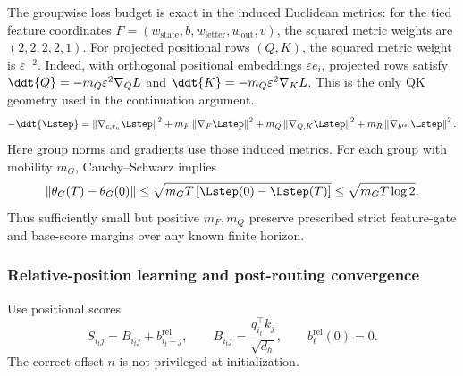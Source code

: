 The groupwise loss budget is exact in the induced Euclidean metrics:
for the tied feature coordinates $F=(w_{\mathrm{state}},b,w_{\mathrm{letter}},w_{\mathrm{out}},v)$, the squared
metric weights are $(2,2,2,2,1)$. For projected positional rows $(Q,K)$,
the squared metric weight is $\varepsilon^{-2}$.
Indeed, with orthogonal positional embeddings $\varepsilon e_i$,
projected rows satisfy $\ddt{Q}=-m_Q\varepsilon^2\nabla_Q L$ and
$\ddt{K}=-m_Q\varepsilon^2\nabla_K L$. This is the only QK geometry
used in the continuation argument.
\begin{equation}\label{eq:lr-mobility-budget}
 -\ddt{\Lstep}=
 \LRnorm{\nabla_{c,r_u}\Lstep}^2
 +m_F\LRnorm{\nabla_F\Lstep}^2
 +m_Q\LRnorm{\nabla_{Q,K}\Lstep}^2
 +m_R\LRnorm{\nabla_{b^{\mathrm{rel}}}\Lstep}^2.
\end{equation}
Here group norms and gradients use those induced metrics. For each group
with mobility $m_G$, Cauchy--Schwarz implies
\begin{equation}\label{eq:lr-movement-budget}
 \LRnorm{\theta_G(T)-\theta_G(0)}
 \le\sqrt{m_G T\,[\Lstep(0)-\Lstep(T)]}
 \le\sqrt{m_G T\log2}.
\end{equation}
Thus sufficiently small but positive $m_F,m_Q$ preserve prescribed
strict feature-gate and base-score margins over any known finite horizon.


\subsubsection{Relative-position learning and post-routing convergence}
\label{app:weak-routing-convergence}

Use positional scores
\begin{equation}\label{eq:lr-relative-scores}
 S_{i_tj}=B_{i_tj}+b_{i_t-j}^{\mathrm{rel}},
 \qquad
 B_{i_tj}=\frac{q_{i_t}^\top k_j}{\sqrt{d_h}},
 \qquad b_\ell^{\mathrm{rel}}(0)=0.
\end{equation}
The correct offset $n$ is not privileged at initialization.

